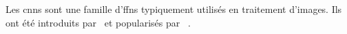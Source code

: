 \section{}

Les \glspl{cnn} sont une famille d'\glspl{ffn} typiquement utilisés en traitement d'images.
Ils ont été introduits par~\cite{Fukushima_1980} et popularisés par%
~\cite{LeCun_Boser_Denker_Henderson_Howard_Hubbard_Jackel_1989,Lecun_Bottou_Bengio_Haffner_1998}.
